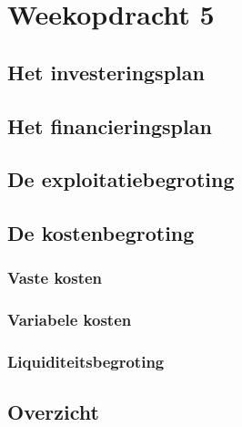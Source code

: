 \chapter{Weekopdracht 5}



\section{Het investeringsplan}

\section{Het financieringsplan}

\section{De exploitatiebegroting}

\section{De kostenbegroting}

\subsection{Vaste kosten}
\subsection{Variabele kosten}
\subsection{Liquiditeitsbegroting}

\section{Overzicht}






